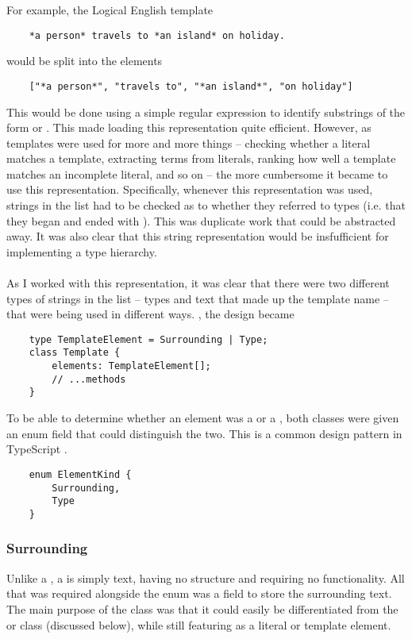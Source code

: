 \documentclass[../main.tex]{subfiles}
\begin{document}
For example, the Logical English template 
\begin{lstlisting}
    *a person* travels to *an island* on holiday.
\end{lstlisting}
would be split into the elements
\begin{lstlisting}
    ["*a person*", "travels to", "*an island*", "on holiday"]
\end{lstlisting}
This would be done using a simple regular expression to identify substrings of the form  or . This made loading this representation quite efficient. However, as templates were used for more and more things -- checking whether a literal matches a template, extracting terms from literals, ranking how well a template matches an incomplete literal, and so on -- the more cumbersome it became to use this representation. Specifically, whenever this representation was used, strings in the list had to be checked as to whether they referred to types (i.e. that they began and ended with \codeword{*}). This was duplicate work that could be abstracted away. It was also clear that this string representation would be insfufficient for implementing a type hierarchy. 
\\ 
\\
As I worked with this representation, it was clear that there were two different types of strings in the list -- types and text that made up the template name -- that were being used in different ways. , the design became
\begin{lstlisting}
    type TemplateElement = Surrounding | Type;
    class Template {
        elements: TemplateElement[];
        // ...methods
    }
\end{lstlisting}

To be able to determine whether an element  was a  or a , both classes were given an enum field  that could distinguish the two. This is a common design pattern in TypeScript \cite{union_types}.

\begin{lstlisting}
    enum ElementKind {
        Surrounding,
        Type
    }
\end{lstlisting}

\subsubsection{Surrounding}
Unlike a , a  is simply text, having no structure and requiring no functionality. All that was required alongside the  enum was a field to store the surrounding text. The main purpose of the  class was that it could easily be differentiated from the  or  class (discussed below), while still featuring as a literal or template element.
\end{document}
